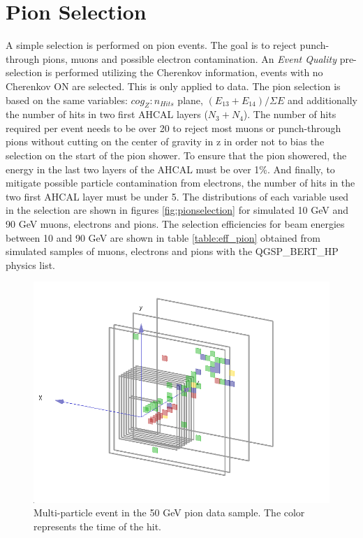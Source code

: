 \section{Pion Selection}
\label{sec:pionsel}

A simple selection is performed on pion events. The goal is to reject punch-through pions, muons and possible electron contamination. An \textit{Event Quality} pre-selection is performed utilizing the Cherenkov information, events with no Cherenkov ON are selected. This is only applied to data. The pion selection is based on the same variables: $cog_Z:n_{Hits}$ plane, $(E_{13}+E_{14})/\Sigma E$ and additionally the number of hits in two first AHCAL layers ($N_3+N_4$). The number of hits required per event needs to be over 20 to reject most muons or punch-through pions without cutting on the center of gravity in z in order not to bias the selection on the start of the pion shower. To ensure that the pion showered, the energy in the last two layers of the AHCAL must be over 1\%. And finally, to mitigate possible particle contamination from electrons, the number of hits in the two first AHCAL layer must be under 5. The distributions of each variable used in the selection are shown in figures \ref{fig:pionselection} for simulated 10 GeV and 90 GeV muons, electrons and pions. The selection efficiencies for beam energies between 10 and 90 GeV are shown in table \ref{table:eff_pion} obtained from simulated samples of muons, electrons and pions with the QGSP\_BERT\_HP physics list.

\begin{figure}[htbp!]
	\centering
	\includegraphics[width=0.7\linewidth]{chap5/fig_AHCAL_timing/Pions/DoubleParticleEventPions.png}
	\caption{Multi-particle event in the 50 GeV pion data sample. The color represents the time of the hit.} \label{fig:DoubleParticleEvent}
\end{figure}

